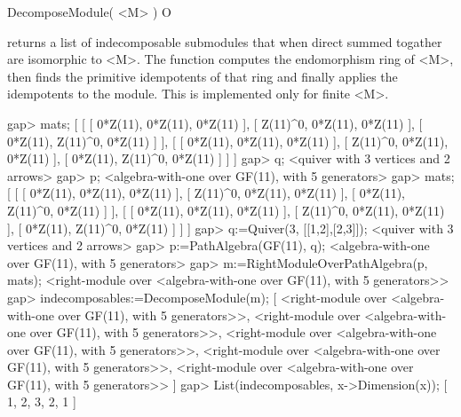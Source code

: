 \>DecomposeModule( <M> ) O

returns a list of indecomposable submodules that when direct summed
togather are isomorphic to <M>.  The function computes the endomorphism
ring of <M>, then finds the primitive idempotents of that ring and
finally applies the idempotents to the module.
This is implemented only for finite <M>.

\beginexample
gap> mats;    
[ [ [ 0*Z(11), 0*Z(11), 0*Z(11) ], [ Z(11)^0, 0*Z(11), 0*Z(11) ], 
      [ 0*Z(11), Z(11)^0, 0*Z(11) ] ], 
  [ [ 0*Z(11), 0*Z(11), 0*Z(11) ], [ Z(11)^0, 0*Z(11), 0*Z(11) ], 
      [ 0*Z(11), Z(11)^0, 0*Z(11) ] ] ]
gap> q;
<quiver with 3 vertices and 2 arrows>
gap> p;
<algebra-with-one over GF(11), with 5 generators>
gap> mats;
[ [ [ 0*Z(11), 0*Z(11), 0*Z(11) ], [ Z(11)^0, 0*Z(11), 0*Z(11) ], 
      [ 0*Z(11), Z(11)^0, 0*Z(11) ] ], 
  [ [ 0*Z(11), 0*Z(11), 0*Z(11) ], [ Z(11)^0, 0*Z(11), 0*Z(11) ], 
      [ 0*Z(11), Z(11)^0, 0*Z(11) ] ] ]
gap> q:=Quiver(3, [[1,2],[2,3]]);
<quiver with 3 vertices and 2 arrows>
gap> p:=PathAlgebra(GF(11), q);
<algebra-with-one over GF(11), with 5 generators>
gap> m:=RightModuleOverPathAlgebra(p, mats);
<right-module over <algebra-with-one over GF(11), with 5 generators>>
gap> indecomposables:=DecomposeModule(m);
[ <right-module over <algebra-with-one over GF(11), with 5 generators>>, 
  <right-module over <algebra-with-one over GF(11), with 5 generators>>, 
  <right-module over <algebra-with-one over GF(11), with 5 generators>>, 
  <right-module over <algebra-with-one over GF(11), with 5 generators>>, 
  <right-module over <algebra-with-one over GF(11), with 5 generators>> ]
gap> List(indecomposables, x->Dimension(x));
[ 1, 2, 3, 2, 1 ]
\endexample
